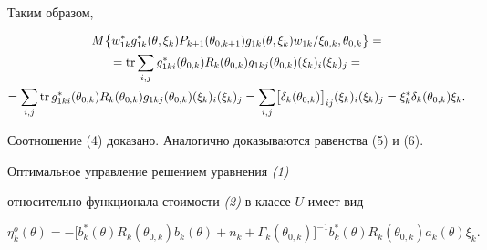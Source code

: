 \begin{pf}
\begin{gather*}
\end{gather*}


Таким образом,


\begin{gather*}


M\bigl\{w_{1k}^{*}g_{1k}^{*}(\theta,\xi_{k})P_{k+1}(\theta_{0,k+1})


g_{1k}(\theta,\xi_{k})w_{1k}/\xi_{0,k},\theta_{0,k}\bigr\}=\\


%


=\tr \sum_{i,j}g_{1ki}^{*}(\theta_{0,k})R_{k}


(\theta_{0,k})g_{1kj}(\theta_{0,k})


(\xi_{k})_{i}(\xi_{k})_{j}=\\


%


=\sum_{i,j}\tr g_{1ki}^{*}(\theta_{0,k})R_{k}


(\theta_{0,k})g_{1kj}(\theta_{0,k})


(\xi_{k})_{i}(\xi_{k})_{j}=


\sum_{i,j}\bigl[\delta_{k}(\theta_{0,k})\bigr]_{ij}


(\xi_{k})_{i}(\xi_{k})_{j}=


\xi_{k}^{*}\delta_{k}(\theta_{0,k})\xi_{k}.


\end{gather*}


Соотношение (4) доказано. Аналогично доказываются равенства (5) и (6).


\end{pf}





\begin{thmnonum} Оптимальное управление решением уравнения {\em (1)}


относительно функционала стоимости {\em (2)} в классе $U$ имеет вид


\begin{equation}


\eta_{k}^{o}(\theta)=-\bigl[b_{k}^{*}(\theta)R_{k}(\theta_{0,k})


b_{k}(\theta)+n_{k}+


\Gamma_{k}(\theta_{0,k})\bigr]^{-1}


b_{k}^{*}(\theta)R_{k}(\theta_{0,k})a_{k}(\theta)\xi_{k}.


\end{equation}


\end{thmnonum}





